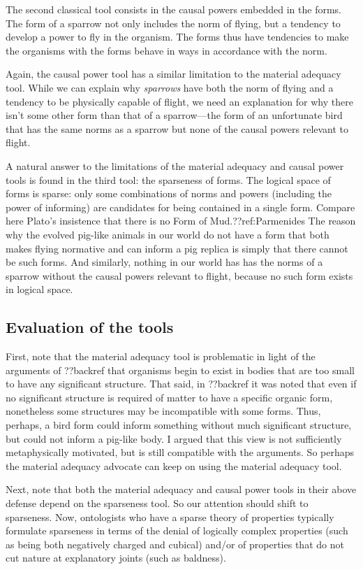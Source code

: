 The second classical tool consists in the causal powers embedded in the forms. The form of a sparrow not only includes the 
norm of flying, but a tendency to develop a power to fly in the organism. The forms thus have tendencies to make the organisms
with the forms behave in ways in accordance with the norm.

Again, the causal power tool has a similar limitation to the material adequacy tool. While we can explain why \textit{sparrows}
have both the norm of flying and a tendency to be physically capable of flight, we need an explanation for why there isn't some 
other form than that of a sparrow---the form of an unfortunate bird that has the same norms as a sparrow but none of the causal 
powers relevant to flight. 

A natural answer to the limitations of the material adequacy and causal power tools is found in the third tool: the sparseness 
of forms. The logical space of forms is sparse: only some combinations of norms and powers (including 
the power of informing) are candidates for being contained in a single form. Compare here Plato's insistence that there is 
no Form of Mud.??ref:Parmenides The reason why the evolved pig-like animals in our world do not have a form that both makes 
flying normative and can inform a pig replica is simply that there cannot be such forms. And similarly, nothing in our world 
has has the norms of a sparrow without the causal powers relevant to flight, because no such form exists in logical space.

\subsection{Evaluation of the tools}
First, note that the material adequacy tool is problematic in light of the arguments of ??backref that organisms begin 
to exist in bodies that are too small to have any significant structure. That said, in ??backref it was noted that even 
if no significant structure is required of matter to have a specific organic form, nonetheless some structures may be 
incompatible with some forms. Thus, perhaps, a bird form could inform something without much significant structure, but 
could not inform a pig-like body. I argued that this view is not sufficiently metaphysically motivated, but is still
compatible with the arguments. So perhaps the material adequacy advocate can keep on using the material adequacy tool.

Next, note that both the material adequacy and causal power tools in their above defense depend on the sparseness tool.
So our attention should shift to sparseness. Now, ontologists who have a sparse theory of properties typically formulate
sparseness in terms of the denial of logically complex properties (such as being both negatively charged and cubical)
and/or of properties that do not cut nature at explanatory joints (such as baldness). 

